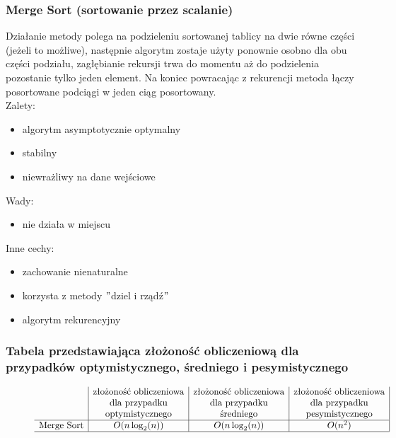 \documentclass[polish,polish,a4paper]{article}
\begin{document}
\begin{spacing}{1.5}
			\subsubsection*{Merge Sort (sortowanie przez scalanie)}
			Działanie metody polega na podzieleniu sortowanej tablicy na dwie równe części (jeżeli to możliwe), następnie algorytm zostaje użyty ponownie osobno dla obu części podziału, zagłębianie rekursji trwa do momentu aż do podzielenia pozostanie tylko jeden element. Na koniec powracając z rekurencji metoda łączy posortowane podciągi w jeden ciąg posortowany.\\
			
	Zalety:
	\begin{itemize}
		\item algorytm asymptotycznie optymalny
		\item stabilny
		\item niewrażliwy na dane wejściowe
	\end{itemize}
	Wady:
	\begin{itemize}
		\item nie działa w miejscu
	\end{itemize}
	Inne cechy:
	\begin{itemize}
		\item zachowanie nienaturalne
		\item korzysta z metody $"$dziel i rządź$"$
		\item algorytm rekurencyjny
	\end{itemize}
	
	\subsubsection*{Tabela przedstawiająca złożoność obliczeniową dla przypadków optymistycznego, średniego i pesymistycznego} 
	\begin{figure}[H]
		
		\begin{equation*}
		\begin{array}{l|c|c|c|}

		&$złożoność obliczeniowa$&$złożoność obliczeniowa$&$złożoność obliczeniowa$\\
		&$dla przypadku$&$dla przypadku$&$dla przypadku$\\
		&$optymistycznego$&$średniego$&$pesymistycznego$\\
		\hline
		$Merge Sort$&O(n\log_{2}(n))&O(n\log_{2}(n))&O(n^2)\\
		\hline
		\end{array}
		\end{equation*}
	\end{figure}
	

\end{spacing}
\end{document}
